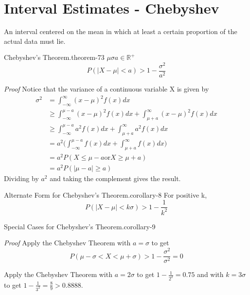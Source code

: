 \documentclass[10pt,]{book}
\makeatletter
\renewcommand*{\proofname}{Proof}
\renewenvironment{proof}[1][\proofname]{\par
  \pushQED{\qed}%
  \normalfont \topsep6\p@\@plus6\p@\relax
  \trivlist
  \item\relax
    {\itshape
    #1\@addpunct{.}}\hspace\labelsep\ignorespaces
}{%
  \popQED\endtrivlist\@endpefalse
}
\numberwithin{equation}{section}
\newcommand{\lt}{<}
\newcommand{\gt}{>}
\makeatother
\begin{document}
\section[{Interval Estimates - Chebyshev}]{Interval Estimates - Chebyshev}\label{section-66}
\hypertarget{p-1251}{}%
An interval centered on the mean in which at least a certain proportion of the actual data must lie.%
\begin{theorem}{Chebyshev's Theorem.}{}{theorem-73}%
\(\mu\)\(\sigma\)\(a \in \mathbb{R}^+\)%
\begin{equation*}
P( \big | X - \mu \big | \lt a ) \gt 1 - \frac{\sigma^2}{a^2}
\end{equation*}
\end{theorem}
\begin{proof}\hypertarget{proof-70}{}
\hypertarget{p-1252}{}%
Notice that the variance of a continuous variable X is given by%
\begin{align*}
\sigma^2 & = \int_{-\infty}^{\infty} (x - \mu)^2 f(x) dx\\
& \ge \int_{-\infty}^{\mu-a} (x - \mu)^2 f(x) dx + \int_{\mu + a}^{\infty} (x - \mu)^2 f(x) dx\\
& \ge \int_{-\infty}^{\mu-a} a^2 f(x) dx + \int_{\mu + a}^{\infty} a^2 f(x) dx\\
& = a^2 \big ( \int_{-\infty}^{\mu-a} f(x) dx + \int_{\mu + a}^{\infty} f(x) dx \big )\\
& = a^2 P( X \le \mu - a \text{or} X \ge \mu + a )\\
& = a^2 P( \big | \mu - a \big | \ge a)
\end{align*}
Dividing by \(a^2\) and taking the complement gives the result.%
\end{proof}
\begin{corollary}{Alternate Form for Chebyshev's Theorem.}{}{corollary-8}%
\hypertarget{p-1253}{}%
For positive k,%
\begin{equation*}
P( \big | X - \mu \big | \lt k \sigma ) \gt 1 - \frac{1}{k^2}
\end{equation*}
%
\end{corollary}
\begin{corollary}{Special Cases for Chebyshev's Theorem.}{}{corollary-9}%
\end{corollary}
\begin{proof}\hypertarget{proof-71}{}
\hypertarget{p-1254}{}%
Apply the Chebyshev Theorem with \(a = \sigma\) to get%
\begin{equation*}
P(\mu - \sigma \lt X \lt \mu + \sigma) \gt 1 - \frac{\sigma^2}{\sigma^2} = 0
\end{equation*}
%
\par
\hypertarget{p-1255}{}%
Apply the Chebyshev Theorem with \(a = 2 \sigma\) to get \(1 - \frac{1}{2^2} = 0.75\) and with \(k = 3 \sigma\) to get \(1 - \frac{1}{3^2} = \frac{8}{9} > 0.8888\).%
\end{proof}
\end{document}
